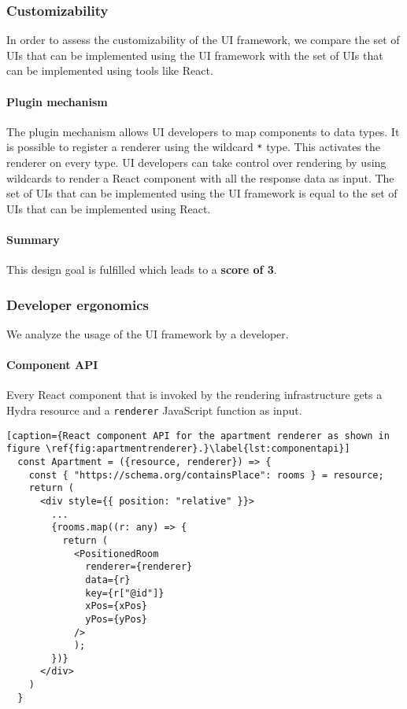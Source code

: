 \subsubsection{Customizability}
In order to assess the customizability of the UI framework, we compare the set of UIs that can be implemented using the UI framework with the set of UIs that can be implemented using tools like React.

\paragraph{Plugin mechanism}
The plugin mechanism allows UI developers to map components to data types. It is possible to register a renderer using the wildcard \lstinline{*} type. This activates the renderer on every type. UI developers can take control over rendering by using wildcards to render a React component with all the response data as input. The set of UIs that can be implemented using the UI framework is equal to the set of UIs that can be implemented using React.

\paragraph{Summary}
This design goal is fulfilled which leads to a \textbf{score of 3}.

\subsubsection{Developer ergonomics}
We analyze the usage of the UI framework by a developer.

\paragraph{Component API}
Every React component that is invoked by the rendering infrastructure gets a Hydra resource and a \lstinline{renderer} JavaScript function as input.

\lstset{language=JSON}
\begin{lstlisting}[caption={React component API for the apartment renderer as shown in figure \ref{fig:apartmentrenderer}.}\label{lst:componentapi}]
  const Apartment = ({resource, renderer}) => {
    const { "https://schema.org/containsPlace": rooms } = resource;
    return (
      <div style={{ position: "relative" }}>
        ...
        {rooms.map((r: any) => {
          return (
            <PositionedRoom
              renderer={renderer}
              data={r}
              key={r["@id"]}
              xPos={xPos}
              yPos={yPos}
            />
            );
        })}
      </div>
    )
  }
\end{lstlisting}

